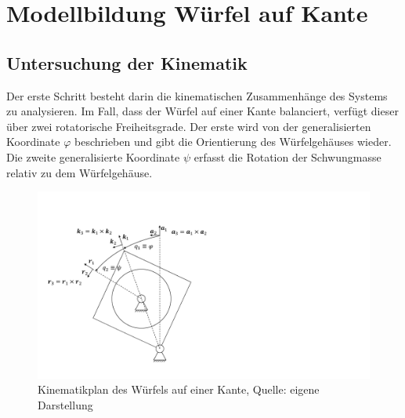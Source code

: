 \chapter{Modellbildung Würfel auf Kante}

\section{Untersuchung der Kinematik}
Der erste Schritt besteht darin die kinematischen Zusammenhänge des Systems zu analysieren. Im Fall, dass der Würfel auf einer Kante balanciert, verfügt dieser über zwei rotatorische Freiheitsgrade. Der erste wird von der generalisierten Koordinate $\varphi$ beschrieben und gibt die Orientierung des Würfelgehäuses wieder. Die zweite generalisierte Koordinate $\psi$ erfasst die Rotation der Schwungmasse relativ zu dem Würfelgehäuse.
\begin{figure}[!ht]
\centering
\includegraphics[width=0.6\linewidth, trim={1cm 1.5cm 18cm 3.5cm}, clip]{img/ModellWuerfelseite}
\caption{Kinematikplan des Würfels auf einer Kante, Quelle: eigene Darstellung}
\label{skizze_dynamik_edge}
\end{figure}


